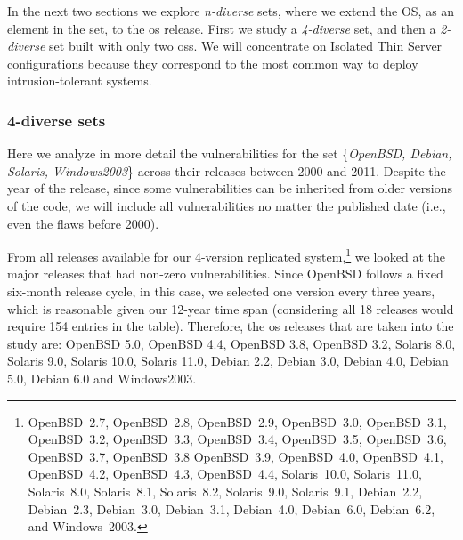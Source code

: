 In the next two sections we explore \emph{n-diverse} sets, where we extend the OS, as an element in the set, to the \gls{os} release. 
First we study a \emph{4-diverse} set, and then a \emph{2-diverse} set built with only two \glspl{os}. 
We will concentrate on Isolated Thin Server configurations because they correspond to the most common way to deploy intrusion-tolerant systems.


\subsubsection*{4-diverse sets}
Here we analyze in more detail the vulnerabilities for the set \{\emph{OpenBSD, Debian, Solaris, Windows2003}\} across their releases between 2000 and 2011. 
Despite the year of the release, since some vulnerabilities can be inherited from older versions of the code, we will include all vulnerabilities no matter the published date (i.e., even the flaws before 2000).

From all releases available for our 4-version replicated system,\footnote[1]{OpenBSD~2.7, OpenBSD~2.8, OpenBSD~2.9, OpenBSD~3.0, OpenBSD~3.1, OpenBSD~3.2, OpenBSD~3.3, OpenBSD~3.4, OpenBSD~3.5, OpenBSD~3.6, OpenBSD~3.7, OpenBSD~3.8 OpenBSD~3.9, OpenBSD~4.0, OpenBSD~4.1, OpenBSD~4.2, OpenBSD~4.3, OpenBSD~4.4,   Solaris~10.0, Solaris~11.0, Solaris~8.0, Solaris~8.1, Solaris~8.2, Solaris~9.0, Solaris~9.1, Debian~2.2, Debian~2.3, Debian~3.0,   Debian~3.1, Debian~4.0, Debian~6.0, Debian~6.2, and Windows~2003.} we looked at the major releases that had non-zero vulnerabilities. 
Since OpenBSD follows a fixed six-month release cycle, in this case, we selected one version every three years, which is reasonable given our 12-year time span (considering all 18 releases would require 154 entries in the table). 
Therefore, the \gls{os} releases that are taken into the study are: OpenBSD 5.0, OpenBSD 4.4, OpenBSD 3.8, OpenBSD 3.2, Solaris 8.0, Solaris 9.0, Solaris 10.0, Solaris 11.0, Debian 2.2, Debian 3.0, Debian 4.0, Debian 5.0, Debian 6.0 and Windows2003.

